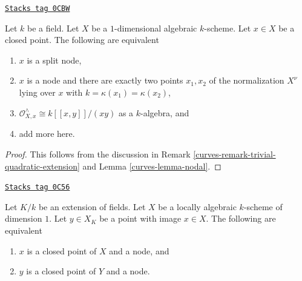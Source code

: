 \begin{lemma}
\label{curves-lemma-split-node}
\href{https://stacks.math.columbia.edu/tag/0CBW}{\texttt{Stacks tag 0CBW}}

Let $k$ be a field. Let $X$ be a $1$-dimensional algebraic $k$-scheme.
Let $x \in X$ be a closed point. The following are equivalent
\begin{enumerate}
\item $x$ is a split node,
\item $x$ is a node and there are exactly two points $x_1, x_2$
of the normalization $X^\nu$ lying over $x$ with
$k = \kappa(x_1) = \kappa(x_2)$,
\item $\mathcal{O}_{X, x}^\wedge \cong k[[x, y]]/(xy)$ as a $k$-algebra, and
\item add more here.
\end{enumerate}
\end{lemma}

\begin{proof}

This follows from the discussion in
Remark \ref{curves-remark-trivial-quadratic-extension}
and Lemma \ref{curves-lemma-nodal}.
\end{proof}

\begin{lemma}
\label{curves-lemma-node-field-extension}
\href{https://stacks.math.columbia.edu/tag/0C56}{\texttt{Stacks tag 0C56}}

Let $K/k$ be an extension of fields. Let $X$ be a locally algebraic
$k$-scheme of dimension $1$. Let $y \in X_K$ be a point with image
$x \in X$. The following are equivalent
\begin{enumerate}
\item $x$ is a closed point of $X$ and a node, and
\item $y$ is a closed point of $Y$ and a node.
\end{enumerate}
\end{lemma}

